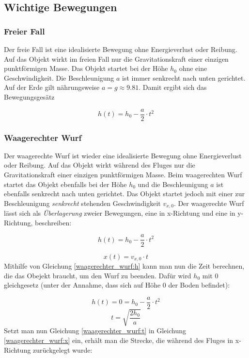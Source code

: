 \documentclass[a4paper]{article}
\begin{document}
		\subsection{Wichtige Bewegungen}
			\subsubsection{Freier Fall}
				Der freie Fall ist eine idealisierte Bewegung ohne Energieverlust oder Reibung. Auf das Objekt wirkt im freien Fall nur die Gravitationskraft einer einzigen punktförmigen Masse. Das Objekt startet bei der Höhe $h_0$ ohne eine Geschwindigkeit. Die Beschleunigung $a$ ist immer senkrecht nach unten gerichtet. Auf der Erde gilt nährungsweise $a=g\approx9.81$. Damit ergibt sich das Bewegungsgesätz
				
				\begin{equation}
					h(t) = h_0 - \frac{a}{2}\cdot t^2
				\end{equation}
			
			\subsubsection{Waagerechter Wurf}
				Der waagerechte Wurf ist wieder eine idealisierte Bewegung ohne Energieverlust oder Reibung. Auf das Objekt wirkt während des Fluges nur die Gravitationskraft einer einzigen punktförmigen Masse. Beim waagerechten Wurf startet das Objekt ebenfalls bei der Höhe $h_0$ und die Beschleunigung $a$ ist ebenfalls senkrecht nach unten gerichtet. Das Objekt startet jedoch mit einer zur Beschleunigung \textit{senkrecht} stehenden Geschwindigkeit $v_{x,0}$. Der waagerechte Wurf lässt sich als \textit{Überlagerung} zweier Bewegungen, eine in x-Richtung und eine in y-Richtung, beschreiben:
				
				\begin{equation}\label{waagerechter_wurf:h}
					h(t) = h_0 - \frac{a}{2}\cdot t^2
				\end{equation}
				
				\begin{equation}\label{waagerechter_wurf:x}
					x(t) = v_{x,0}\cdot t
				\end{equation}
				Mithilfe von Gleichung \ref{waagerechter_wurf:h} kann man nun die Zeit berechnen, die das Obejekt braucht, um den Wurf zu beenden. Daf\"ur wird $h_0$ mit $0$ gleichgesetz (unter der Annahme, dass sich auf Höhe $0$ der Boden befindet):
				
				\begin{equation}
					h(t) = 0 =  h_0 - \frac{a}{2}\cdot t^2
				\end{equation}
				\begin{equation}\label{waagerechter_wurf:t}
					t = \sqrt{\frac{2h_0}{a}}
				\end{equation}
				Setzt man nun Gleichung \ref{waagerechter_wurf:t} in Gleichung \ref{waagerechter_wurf:x} ein, erhält man die Strecke, die während des Fluges in x-Richtung zur\"uckgelegt wurde:
			
\end{document}
